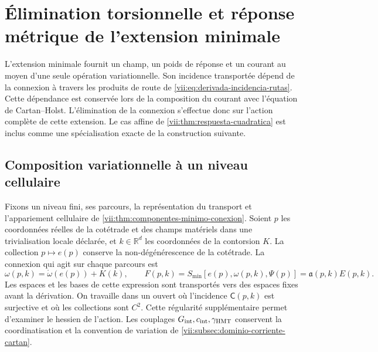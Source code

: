 
\section{Élimination torsionnelle et réponse métrique de l'extension minimale}
\label{vii:sec:eliminacion-torsional-no-lineal}

L'extension minimale fournit un champ, un poids de réponse et un courant au moyen d'une seule opération variationnelle. Son incidence transportée dépend de la connexion à travers les produits de route de \eqref{vii:eq:derivada-incidencia-rutas}. Cette dépendance est conservée lors de la composition du courant avec l'équation de Cartan--Holst. L'élimination de la connexion s'effectue donc sur l'action complète de cette extension. Le cas affine de \ref{vii:thm:respuesta-cuadratica} est inclus comme une spécialisation exacte de la construction suivante.

\subsection{Composition variationnelle à un niveau cellulaire}
\label{vii:subsec:composicion-torsional-celular}

Fixons un niveau fini, ses parcours, la représentation du transport et l'appariement cellulaire de \ref{vii:thm:componentes-minimo-conexion}. Soient \(p\) les coordonnées réelles de la cotétrade et des champs matériels dans une trivialisation locale déclarée, et \(k\in\mathbb R^d\) les coordonnées de la contorsion \(K\). La collection \(p\mapsto e(p)\) conserve la non-dégénérescence de la cotétrade. La connexion qui agit sur chaque parcours est
\begin{equation}
 \omega(p,k)=\mathring\omega(e(p))+K(k),\qquad
 F(p,k)=S_{\min}[e(p),\omega(p,k),\Psi(p)]
       =\mathfrak a(p,k)E(p,k).
 \label{vii:eq:accion-minima-en-contorsion}
\end{equation}
Les espaces et les bases de cette expression sont transportés vers des espaces fixes avant la dérivation. On travaille dans un ouvert où l'incidence \(\mathsf C(p,k)\) est surjective et où les collections sont \(C^2\). Cette régularité supplémentaire permet d'examiner le hessien de l'action. Les couplages \(G_{\rm int},c_{\rm int},\gamma_{\rm HMT}\) conservent la coordinatisation et la convention de variation de \ref{vii:subsec:dominio-corriente-cartan}.

